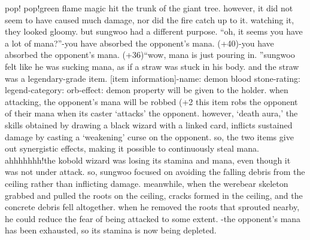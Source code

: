pop! pop!green flame magic hit the trunk of the giant tree.
 however, it did not seem to have caused much damage, nor did the fire catch up to it.
 watching it, they looked gloomy.
but sungwoo had a different purpose.
“oh, it seems you have a lot of mana?”-you have absorbed the opponent’s mana.
 (+40)-you have absorbed the opponent’s mana.
 (+36)“wow, mana is just pouring in.
”sungwoo felt like he was sucking mana, as if a straw was stuck in his body.
 and the straw was a legendary-grade item.
[item information]-name: demon blood stone-rating: legend-category: orb-effect: demon property will be given to the holder.
 when attacking, the opponent’s mana will be robbed (+2%
this item robs the opponent of their mana when its caster ‘attacks’ the opponent.
 however, ‘death aura,’ the skills obtained by drawing a black wizard with a linked card, inflicts sustained damage by casting a ‘weakening’ curse on the opponent.
 so, the two items give out synergistic effects, making it possible to continuously steal mana.
ahhhhhhh!the kobold wizard was losing its stamina and mana, even though it was not under attack.
so, sungwoo focused on avoiding the falling debris from the ceiling rather than inflicting damage.
meanwhile, when the werebear skeleton grabbed and pulled the roots on the ceiling, cracks formed in the ceiling, and the concrete debris fell altogether.
 when he removed the roots that sprouted nearby, he could reduce the fear of being attacked to some extent.
-the opponent’s mana has been exhausted, so its stamina is now being depleted.

